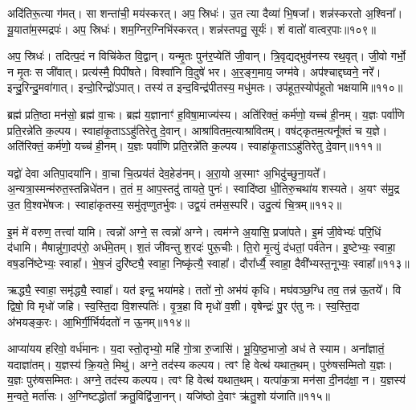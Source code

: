 अदि॑तिरू॒त्या ग॑मत्।
सा शन्ता॑ची॒ मय॑स्करत्।
अप॒ स्रिधः॑।
उ॒त त्या दैव्या॑ भि॒षजा᳚।
शन्न॑स्करतो अ॒श्विना᳚।
यू॒याता॑म॒स्मद्रपः॑।
अप॒ स्रिधः॑।
शम॒ग्निर॒ग्निभि॑स्करत्।
शन्न॑स्तपतु॒ सूर्यः॑।
शं वातो॑ वात्वर॒पाः॥१०९॥

अप॒ स्रिधः॑।
तदित्प॒दं न विचि॑केत वि॒द्वान्।
यन्मृ॒तः पुन॑र॒प्येति॑ जी॒वान्।
त्रि॒वृद्यद्भुव॑नस्य रथ॒वृत्।
जी॒वो गर्भो॒ न मृ॒तः स जी॑वात्।
प्रत्य॑स्मै॒ पिपी॑षते।
विश्वा॑नि वि॒दुषे॑ भर।
अ॒र॒ङ्ग॒माय॒ जग्म॑वे।
अप॑श्चाद्दघ्वने॒ नरे᳚।
इन्दु॒रिन्दु॒मवा॑गात्।
इन्दो॒रिन्द्रो॑\-ऽपात्।
तस्य॑ त इन्द॒विन्द्र॑पीतस्य॒ मधु॑मतः।
उप॑हूत॒स्योप॑हूतो भक्षयामि॥११०॥\anuvakamend[उ॒द॒र्॒ष इ॑न्द्रि॒येण॒ गा म॒तिर॑र॒पा अ॑गा॒त्रीणि॑ च]

ब्रह्म॑ प्रति॒ष्ठा मन॑सो॒ ब्रह्म॑ वा॒चः।
ब्रह्म॑ य॒ज्ञानाꣳ॑ ह॒विषा॒माज्य॑स्य।
अति॑रिक्तं॒ कर्म॑णो॒ यच्च॑ ही॒नम्।
य॒ज्ञः पर्वा॑णि प्रति॒रन्ने॑ति क॒ल्पय\sn{}।
स्वाहा॑कृ॒ता\-ऽऽहु॑तिरेतु दे॒वान्।
आश्रा॑वितम॒त्याश्रा॑वितम्।
वष॑ट्कृतम॒त्यनू᳚क्तं च य॒ज्ञे।
अति॑रिक्तं॒ कर्म॑णो॒ यच्च॑ ही॒नम्।
य॒ज्ञः पर्वा॑णि प्रति॒रन्ने॑ति क॒ल्पय\sn{}।
स्वाहा॑कृ॒ता\-ऽऽहु॑तिरेतु दे॒वान्॥१११॥

यद्वो॑ देवा अतिपा॒दया॑नि।
वा॒चा चि॒त्प्रय॑तं देव॒हेड॑नम्।
अ॒रा॒यो अ॒स्माꣳ अ॒भिदु॑च्छुना॒यते᳚।
अ॒न्यत्रा॒स्मन्म॑रुत॒स्तन्निधे॑\-तन।
त॒तं म॒ आप॒स्तदु॑ तायते॒ पुनः॑।
स्वादि॑ष्ठा धी॒तिरु॒चथा॑य शस्यते।
अ॒यꣳ स॑मु॒द्र उ॒त वि॒श्वभे॑षजः।
स्वाहा॑कृतस्य॒ समु॑तृप्णुतर्भुवः।
उद्व॒यं तम॑स॒स्परि॑।
उदु॒त्यं चि॒त्रम्॥११२॥

इ॒मं मे॑ वरुण॒ तत्त्वा॑ यामि।
त्वन्नो॑ अग्ने॒ स त्वन्नो॑ अग्ने।
त्वम॑ग्ने अ॒यासि॒ प्रजा॑पते।
इ॒मं जी॒वेभ्यः॑ परि॒धिं द॑धामि।
मैषान्नु॑गा॒दप॑रो॒ अर्ध॑मे॒तम्।
श॒तं जी॑वन्तु श॒रदः॑ पुरू॒चीः।
ति॒रो मृ॒त्युं द॑धतां॒ पर्व॑तेन।
इ॒ष्टेभ्यः॒ स्वाहा॒ वष॒डनि॑ष्टेभ्यः॒ स्वाहा᳚।
भे॒ष॒जं दुरि॑ष्ट्यै॒ स्वाहा॒ निष्कृ॑त्यै॒ स्वाहा᳚।
दौरा᳚र्ध्यै॒ स्वाहा॒ दैवी᳚भ्यस्त॒नूभ्यः॒ स्वाहा᳚॥११३॥

ऋद्ध्यै॒ स्वाहा॒ समृ॑द्ध्यै॒ स्वाहा᳚।
यत॑ इन्द्र॒ भया॑महे।
ततो॑ नो॒ अभ॑यं कृधि।
मघ॑वञ्छ॒ग्धि तव॒ तन्न॑ ऊ॒तये᳚।
वि द्विषो॒ वि मृधो॑ जहि।
स्व॒स्ति॒दा वि॒शस्पतिः॑।
वृ॒त्र॒हा वि मृधो॑ व॒शी।
वृषेन्द्रः॑ पु॒र ए॑तु नः।
स्व॒स्ति॒दा अ॑भयङ्क॒रः।
आ॒भिर्गी॒र्भिर्यदतो॑ न ऊ॒नम्॥११४॥

आप्या॑यय हरिवो॒ वर्ध॑मानः।
य॒दा स्तो॒तृभ्यो॒ महि॑ गो॒त्रा रु॒जासि॑।
भू॒यि॒ष्ठ॒भाजो॒ अध॑ ते स्याम।
अना᳚ज्ञातं॒ यदाज्ञा॑तम्।
य॒ज्ञस्य॑ क्रि॒यते॒ मिथु॑।
अग्ने॒ तद॑स्य कल्पय।
त्वꣳ हि वेत्थ॑ यथात॒थम्।
पुरु॑षसम्मितो य॒ज्ञः।
य॒ज्ञः पुरु॑षसम्मितः।
अग्ने॒ तद॑स्य कल्पय।
त्वꣳ हि वेत्थ॑ यथात॒थम्।
यत्पा॑क॒त्रा मन॑सा दी॒नद॑क्षा॒ न।
य॒ज्ञस्य॑ म॒न्वते॒ मर्ता॑सः।
अ॒ग्निष्टद्धोता᳚ क्रतु॒विद्वि॑जा॒नन्।
यजि॑ष्ठो दे॒वाꣳ ऋ॑तु॒शो य॑जाति॥११५॥\anuvakamend[दे॒वाꣴश्चि॒त्रं त॒नूभ्यः॒ स्वाहो॒नं पुरु॑षसम्मि॒तो\-ऽग्ने॒ तद॑स्य कल्पय॒ पञ्च॑ च]

